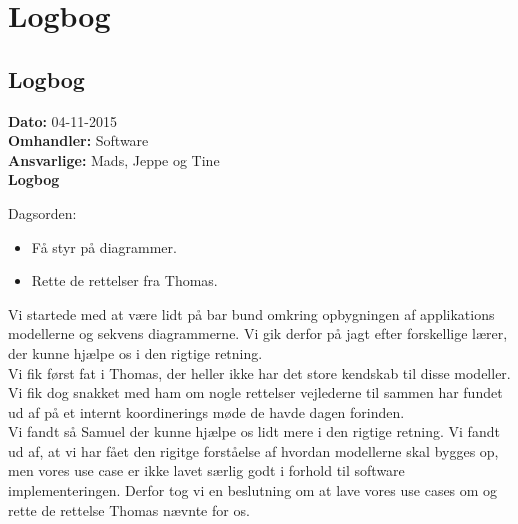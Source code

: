 \chapter{Logbog}
\section{Logbog}

\textbf{Dato:} 04-11-2015 \\
\textbf{Omhandler:} Software \\
\textbf{Ansvarlige:} Mads, Jeppe og Tine \\
\textbf{Logbog}

Dagsorden:
\begin{itemize}
	\item Få styr på diagrammer.
	\item Rette de rettelser fra Thomas. 
\end{itemize}

Vi startede med at være lidt på bar bund omkring opbygningen af applikations modellerne og sekvens diagrammerne. Vi gik derfor på jagt efter forskellige lærer, der kunne hjælpe os i den rigtige retning.\\
Vi fik først fat i Thomas, der heller ikke har det store kendskab til disse modeller. Vi fik dog snakket med ham om nogle rettelser vejlederne til sammen har fundet ud af på et internt koordinerings møde de havde dagen forinden. \\
Vi fandt så Samuel der kunne hjælpe os lidt mere i den rigtige retning. Vi fandt ud af, at vi har fået den rigitge forståelse af hvordan modellerne skal bygges op, men vores use case er ikke lavet særlig godt i forhold til software implementeringen. Derfor tog vi en beslutning om at lave vores use cases om og rette de rettelse Thomas nævnte for os. 
   
